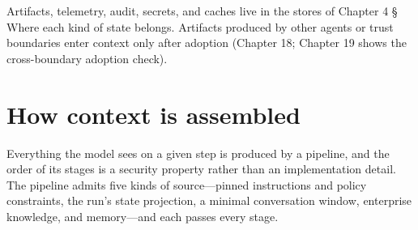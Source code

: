 Artifacts, telemetry, audit, secrets, and caches live in the stores of Chapter 4 § Where each kind of state belongs. Artifacts produced by other agents or trust boundaries enter context only after adoption (Chapter 18; Chapter 19 shows the cross-boundary adoption check).\par

\section{How context is assembled}

Everything the model sees on a given step is produced by a pipeline, and the order of its stages is a security property rather than an implementation detail. The pipeline admits five kinds of source—pinned instructions and policy constraints, the run's state projection, a minimal conversation window, enterprise knowledge, and memory—and each passes every stage.\par


